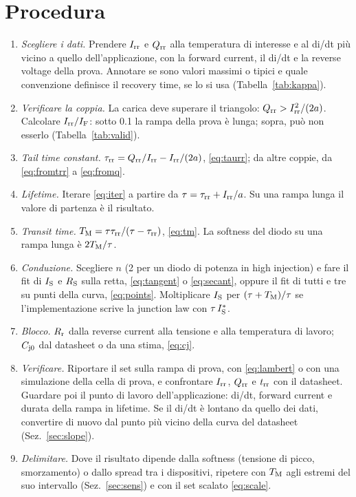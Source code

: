 \documentclass[10pt,a4paper]{scrartcl}
\let\newcommand\lmitdefine
\newcommand{\IF}{I_\mathrm{F}}
\newcommand{\Irr}{I_\mathrm{rr}}
\newcommand{\Qrr}{Q_\mathrm{rr}}
\newcommand{\trr}{t_\mathrm{rr}}
\newcommand{\taurr}{\tau_\mathrm{rr}}
\newcommand{\TM}{T_\mathrm{M}}
\newcommand{\IS}{I_\mathrm{S}}
\newcommand{\RS}{R_\mathrm{S}}
\newcommand{\Rr}{R_\mathrm{r}}
\newcommand{\Cjo}{C_\mathrm{j0}}
\begin{document}
\section{Procedura}
\label{sec:procedure}
\begin{enumerate}
\item \emph{Scegliere i dati.} Prendere $\Irr$ e $\Qrr$ alla temperatura di interesse e al di/dt più vicino a quello dell'applicazione, con la forward current, il di/dt e la reverse voltage della prova. Annotare se sono valori massimi o tipici e quale convenzione definisce il recovery time, se lo si usa (Tabella~\ref{tab:kappa}).
\item \emph{Verificare la coppia.} La carica deve superare il triangolo: $\Qrr > \Irr^2/(2a)$. Calcolare $\Irr/\IF$: sotto \num{0.1} la rampa della prova è lunga; sopra, può non esserlo (Tabella~\ref{tab:valid}).
\item \emph{Tail time constant.} $\taurr = \Qrr/\Irr - \Irr/(2a)$, \eqref{eq:taurr}; da altre coppie, da \eqref{eq:fromtrr} a \eqref{eq:fromq}.
\item \emph{Lifetime.} Iterare \eqref{eq:iter} a partire da $\tau = \taurr + \Irr/a$. Su una rampa lunga il valore di partenza è il risultato.
\item \emph{Transit time.} $\TM = \tau\taurr/(\tau-\taurr)$, \eqref{eq:tm}. La softness del diodo su una rampa lunga è $2\TM/\tau$.
\item \emph{Conduzione.} Scegliere $n$ (2 per un diodo di potenza in high injection) e fare il fit di $\IS$ e $\RS$ sulla retta, \eqref{eq:tangent} o \eqref{eq:secant}, oppure il fit di tutti e tre su punti della curva, \eqref{eq:points}. Moltiplicare $\IS$ per $(\tau+\TM)/\tau$ se l'implementazione scrive la junction law con $\tau\,\IS^{*}$.
\item \emph{Blocco.} $\Rr$ dalla reverse current alla tensione e alla temperatura di lavoro; $\Cjo$ dal datasheet o da una stima, \eqref{eq:cj}.
\item \emph{Verificare.} Riportare il set sulla rampa di prova, con \eqref{eq:lambert} o con una simulazione della cella di prova, e confrontare $\Irr$, $\Qrr$ e $\trr$ con il datasheet. Guardare poi il punto di lavoro dell'applicazione: di/dt, forward current e durata della rampa in lifetime. Se il di/dt è lontano da quello dei dati, convertire di nuovo dal punto più vicino della curva del datasheet (Sez.~\ref{sec:slope}).
\item \emph{Delimitare.} Dove il risultato dipende dalla softness (tensione di picco, smorzamento) o dallo spread tra i dispositivi, ripetere con $\TM$ agli estremi del suo intervallo (Sez.~\ref{sec:sens}) e con il set scalato \eqref{eq:scale}.
\end{enumerate}
\end{document}
